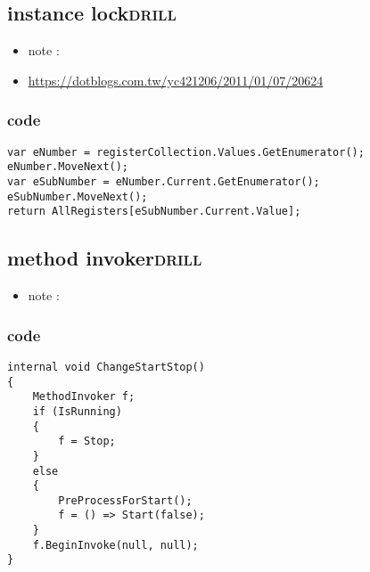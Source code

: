 \documentclass[11pt]{article}
\begin{document}
\subsection{instance lock\hfill{}\textsc{drill}}
\label{sec:orga7be6bf}
\begin{itemize}
\item note :
\item \url{https://dotblogs.com.tw/yc421206/2011/01/07/20624}
\end{itemize}
\subsubsection{code}
\label{sec:orgb719164}
\begin{verbatim}
var eNumber = registerCollection.Values.GetEnumerator();
eNumber.MoveNext();
var eSubNumber = eNumber.Current.GetEnumerator();
eSubNumber.MoveNext();
return AllRegisters[eSubNumber.Current.Value];

\end{verbatim}

\subsection{method invoker\hfill{}\textsc{drill}}
\label{sec:orgdea61ef}
\begin{itemize}
\item note :
\end{itemize}
\subsubsection{code}
\label{sec:orgb9febc6}
\begin{verbatim}
internal void ChangeStartStop()
{
    MethodInvoker f;
    if (IsRunning)
    {
        f = Stop;
    }
    else
    {
        PreProcessForStart();
        f = () => Start(false);
    }
    f.BeginInvoke(null, null);
}

\end{verbatim}
\end{document}
